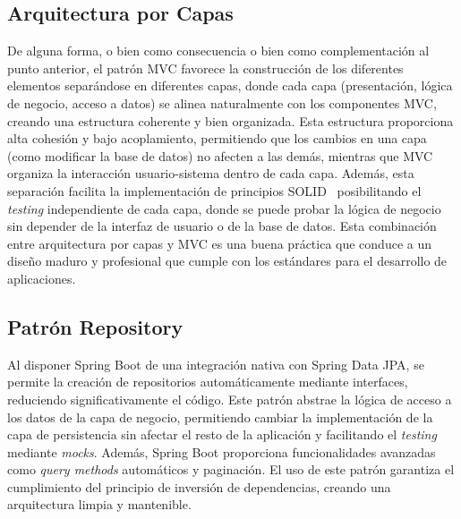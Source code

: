 \subsection{Arquitectura por Capas}\label{arquitectura-por-capas}
De alguna forma, o bien como consecuencia o bien como complementación al punto anterior, el patrón MVC favorece la construcción de los diferentes elementos separándose en diferentes capas, donde cada capa (presentación, lógica de negocio, acceso a datos) se alinea naturalmente con los componentes MVC, creando una estructura coherente y bien organizada. Esta estructura proporciona alta cohesión y bajo acoplamiento, permitiendo que los cambios en una capa (como modificar la base de datos) no afecten a las demás, mientras que MVC organiza la interacción usuario-sistema dentro de cada capa. Además, esta separación facilita la implementación de principios SOLID~\cite{solid} posibilitando el \emph{testing} independiente de cada capa, donde se puede probar la lógica de negocio sin depender de la interfaz de usuario o de la base de datos. Esta combinación entre arquitectura por capas y MVC es una buena práctica que conduce a un diseño maduro y profesional que cumple con los estándares para el desarrollo de aplicaciones.

\subsection{Patrón Repository}\label{patron-repository}
Al disponer Spring Boot de una integración nativa con Spring Data JPA, se permite la creación de repositorios automáticamente mediante interfaces, reduciendo significativamente el código. Este patrón abstrae la lógica de acceso a los datos de la capa de negocio, permitiendo cambiar la implementación de la capa de persistencia sin afectar el resto de la aplicación y facilitando el \emph{testing} mediante \emph{mocks}. Además, Spring Boot proporciona funcionalidades avanzadas como \emph{query methods} automáticos y paginación. El uso de este patrón garantiza el cumplimiento del principio de inversión de dependencias, creando una arquitectura limpia y mantenible.

